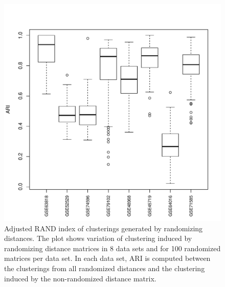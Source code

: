\documentclass[aoas,preprint]{imsart}
\begin{document}
% 
\begin{figure}[h!]
\includegraphics[scale = 0.7]{Figs/ARI.pdf}
 \caption{
 Adjusted RAND index of 
 clusterings  generated by randomizing distances.
 The plot shows  variation of clustering induced by randomizing distance matrices
 in 8 data sets and for 100 randomized matrices per data set.  In each data set, ARI is computed 
 between the clusterings from all randomized distances and the clustering induced by the non-randomized
 distance matrix.
}
  \label{fig:ARI}
\end{figure}
\end{document}
